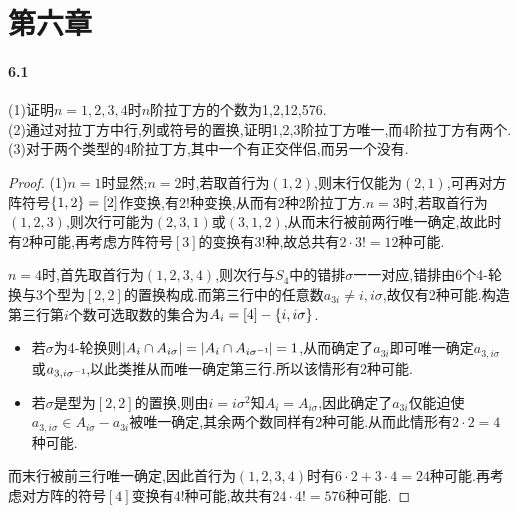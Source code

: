 \documentclass{article}
\begin{document}
\section{第六章}
\paragraph{6.1}(1)证明$n=1,2,3,4$时$n$阶拉丁方的个数为1,2,12,576.\\
(2)通过对拉丁方中行,列或符号的置换,证明1,2,3阶拉丁方唯一,而4阶拉丁方有两个.\\
(3)对于两个类型的4阶拉丁方,其中一个有正交伴侣,而另一个没有.
\begin{proof}
    (1)$n=1$时显然;$n=2$时,若取首行为$(1,2)$,则末行仅能为$(2,1)$,可再对方阵符号$\left\{1,2\right\}=[2]$作变换,有$2!$种变换,从而有2种2阶拉丁方.$n=3$时,若取首行为$(1,2,3)$,则次行可能为$(2,3,1)$或$(3,1,2)$,从而末行被前两行唯一确定,故此时有2种可能,再考虑方阵符号$[3]$的变换有$3!$种,故总共有$2\cdot 3!=12$种可能.

    $n=4$时,首先取首行为$(1,2,3,4)$,则次行与$S_4$中的错排$\sigma$一一对应,错排由6个4-轮换与3个型为$[2,2]$的置换构成.而第三行中的任意数$a_{3i}\neq i, i\sigma$,故仅有2种可能.构造第三行第$i$个数可选取数的集合为$A_i=[4]-\left\{i,i\sigma\right\}$.
    \begin{itemize}
        \item 若$\sigma$为4-轮换则$\left|A_i\cap A_{i\sigma}\right|=\left|A_i\cap A_{i\sigma^{-1}\!}\right|=1$,从而确定了$a_{3i}$即可唯一确定$a_{3,i\sigma}$或$a_{3,i\sigma^{-1}\!}$,以此类推从而唯一确定第三行.所以该情形有2种可能.
        \item 若$\sigma$是型为$[2,2]$的置换,则由$i=i\sigma^2$知$A_i=A_{i\sigma}$,因此确定了$a_{3i}$仅能迫使$a_{3,i\sigma}\in A_{i\sigma}-a_{3i}$被唯一确定,其余两个数同样有2种可能.从而此情形有$2\cdot 2=4$种可能.
    \end{itemize}
    而末行被前三行唯一确定,因此首行为$(1,2,3,4)$时有$6\cdot 2+3\cdot 4=24$种可能.再考虑对方阵的符号$[4]$变换有$4!$种可能,故共有$24\cdot 4!=576$种可能.


\end{proof}
\end{document}
